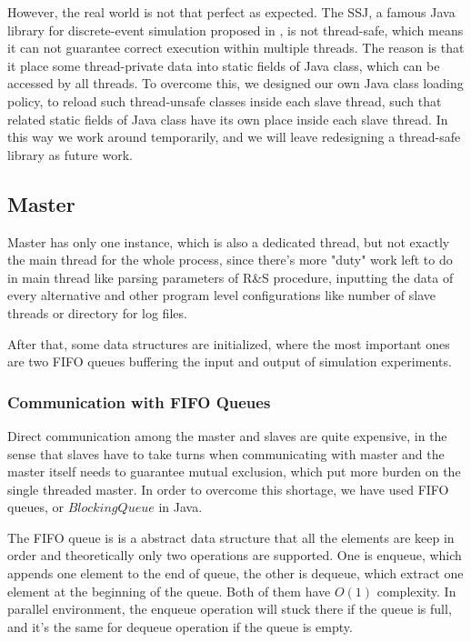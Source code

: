 However, the real world is not that perfect as expected. The SSJ, a famous Java library for discrete-event simulation proposed in \cite{ssj}, is not thread-safe, which means it can not guarantee correct execution within multiple threads. The reason is that it place some thread-private data into static fields of Java class, which can be accessed by all threads. To overcome this, we designed our own Java class loading policy, to reload such thread-unsafe classes inside each slave thread, such that related static fields of Java class have its own place inside each slave thread. In this way we work around temporarily, and we will leave redesigning a thread-safe library as future work.

\subsection{Master}

Master has only one instance, which is also a dedicated thread, but not exactly the main thread for the whole process, since there's more "duty" work left to do in main thread like parsing parameters of R\&S procedure, inputting the data of every alternative and other program level configurations like number of slave threads or directory for log files.

After that, some data structures are initialized, where the most important ones are two FIFO queues buffering the input and output of simulation experiments.

\subsubsection{Communication with FIFO Queues}

Direct communication among the master and slaves are quite expensive, in the sense that slaves have to take turns when communicating with master and the master itself needs to guarantee mutual exclusion, which put more burden on the single threaded master. In order to overcome this shortage, we have used FIFO queues, or $BlockingQueue$ in Java.

The FIFO queue is is a abstract data structure that all the elements are keep in order and theoretically only two operations are supported. One is enqueue, which appends one element to the end of queue, the other is dequeue, which extract one element at the beginning of the queue. Both of them have $O(1)$ complexity. In parallel environment, the enqueue operation will stuck there if the queue is full, and it's the same for dequeue operation if the queue is empty.

